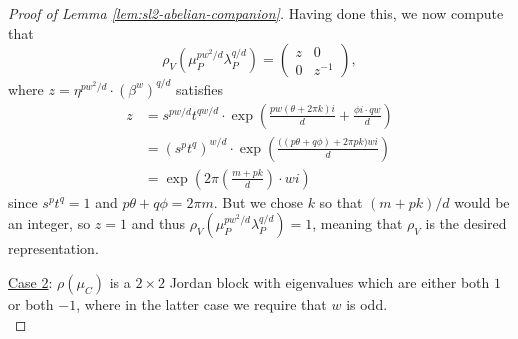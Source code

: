 \documentclass[11pt]{amsart}
\numberwithin{equation}{section}
\numberwithin{theorem}{section}
\theoremstyle{definition}
\begin{document}
\begin{proof}[Proof of Lemma \ref{lem:sl2-abelian-companion}]
Having done this, we now compute that
\[ \rho_V(\mu_P^{pw^2/d} \lambda_P^{q/d}) = \begin{pmatrix} z & 0 \\ 0 & z^{-1} \end{pmatrix}, \]
where $z = \eta^{pw^2/d} \cdot (\beta^w)^{q/d}$ satisfies
\begin{align*}
z &= s^{pw/d} t^{qw/d} \cdot \exp\left( \frac{pw(\theta+2\pi k)i}{d} + \frac{\phi i \cdot qw}{d}\right) \\
&= (s^pt^q)^{w/d} \cdot \exp\left( \frac{\big((p\theta+q\phi) + 2\pi pk\big)wi }{d} \right) \\
&= \exp\left( 2\pi \left(\frac{m+pk}{d}\right) \cdot wi \right)
\end{align*}
since $s^pt^q = 1$ and $p\theta + q\phi = 2\pi m$.  But we chose $k$ so that $(m+pk)/d$ would be an integer, so $z=1$ and thus $\rho_V(\mu_P^{pw^2/d}\lambda_P^{q/d}) = 1$, meaning that $\rho_V$ is the desired representation.

\vspace{1em}\noindent
\underline{Case 2}: $\rho(\mu_C)$ is a $2\times 2$ Jordan block with  eigenvalues which are either both $1$ or both $-1$, where  in the latter case we require that $w$ is odd.\\


\end{proof}
\end{document}
